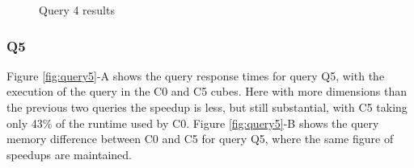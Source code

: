 \begin{figure}[H]
  \caption{Query 4 results}\label{fig:query4}
  \vspace{6mm}
  \begin{center}
  \end{center}
  \vspace{2mm}
\end{figure}

\hypertarget{q5-1}{%
\subsubsection{Q5}\label{q5-1}}

Figure \ref{fig:query5}-A shows the query response times for query Q5, with the execution of the query in the C0 and C5 cubes.
Here with more dimensions than the previous two queries the speedup is less, but still substantial, with C5 taking only 43\% of the runtime used by C0.
Figure \ref{fig:query5}-B shows the query memory difference between C0 and C5 for query Q5, where the same figure of speedups are maintained.


